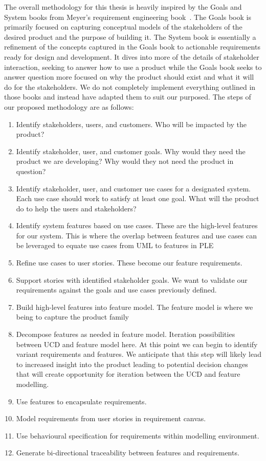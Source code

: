 The overall methodology for this thesis is heavily inspired by the Goals and System books from Meyer's requirement engineering book~\cite{meyer2022handbook}. The Goals book is primarily focused on capturing conceptual models of the stakeholders of the desired product and the purpose of building it. The System book is essentially a refinement of the concepts captured in the Goals book to actionable requirements ready for design and development. It dives into more of the details of stakeholder interaction, seeking to answer how to use a product while the Goals book seeks to answer question more focused on why the product should exist and what it will do for the stakeholders. We do not completely implement everything outlined in those books and instead have adapted them to suit our purposed. The steps of our proposed methodology are as follows:
\begin{enumerate}
	\item Identify stakeholders, users, and customers. Who will be impacted by the product?
	\item Identify stakeholder, user, and customer goals. Why would they need the product we are developing? Why would they not need the product in question?
	\item Identify stakeholder, user, and customer use cases for a designated system. Each use case should work to satisfy at least one goal. What will the product do to help the users and stakeholders?
	\item Identify system features based on use cases. These are the high-level features for our system. This is where the overlap between features and use cases can be leveraged to equate use cases from \ac{UML} to features in \ac{PLE}
	\item Refine use cases to user stories. These become our feature requirements.
	\item Support stories with identified stakeholder goals. We want to validate our requirements against the goals and use cases previously defined.
	\item Build high-level features into feature model. The feature model is where we being to capture the product family
	\item Decompose features as needed in feature model. Iteration possibilities between UCD and feature model here. At this point we can begin to identify variant requirements and features. We anticipate that this step will likely lead to increased insight into the product leading to potential decision changes that will create opportunity for iteration between the \ac{UCD} and feature modelling.
	\item Use features to encapsulate requirements.
	\item Model requirements from user stories in requirement canvas.
	\item Use behavioural specification for requirements within modelling environment.
	\item Generate bi-directional traceability between features and requirements.
\end{enumerate}


